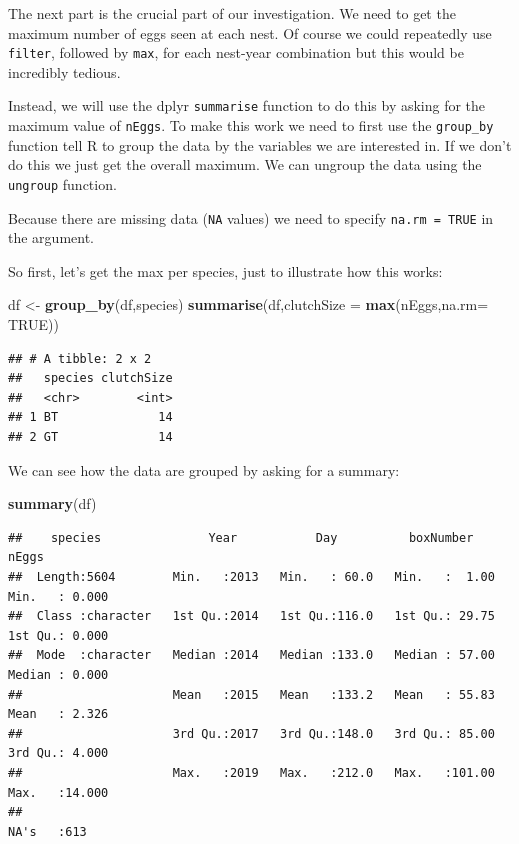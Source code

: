 \documentclass[
  a4paperpaper,
]{book}
\newenvironment{Shaded}{\begin{snugshade}}{\end{snugshade}}
\newcommand{\DataTypeTok}[1]{\textcolor[rgb]{0.13,0.29,0.53}{#1}}
\newcommand{\KeywordTok}[1]{\textcolor[rgb]{0.13,0.29,0.53}{\textbf{#1}}}
\newcommand{\NormalTok}[1]{#1}
\newcommand{\OtherTok}[1]{\textcolor[rgb]{0.56,0.35,0.01}{#1}}
\newcommand{\StringTok}[1]{\textcolor[rgb]{0.31,0.60,0.02}{#1}}
\begin{document}
The next part is the crucial part of our investigation. We need to get the maximum number of eggs seen at each nest. Of course we could repeatedly use \texttt{filter}, followed by \texttt{max}, for each nest-year combination but this would be incredibly tedious.

Instead, we will use the dplyr \texttt{summarise} function to do this by asking for the maximum value of \texttt{nEggs}. To make this work we need to first use the \texttt{group\_by} function tell R to group the data by the variables we are interested in. If we don't do this we just get the overall maximum. We can ungroup the data using the \texttt{ungroup} function.

Because there are missing data (\texttt{NA} values) we need to specify \texttt{na.rm\ =\ TRUE} in the argument.

So first, let's get the max per species, just to illustrate how this works:

\begin{Shaded}
\begin{Highlighting}[]
\NormalTok{df \textless{}{-}}\StringTok{ }\KeywordTok{group\_by}\NormalTok{(df,species)}
\KeywordTok{summarise}\NormalTok{(df,}\DataTypeTok{clutchSize =} \KeywordTok{max}\NormalTok{(nEggs,}\DataTypeTok{na.rm=} \OtherTok{TRUE}\NormalTok{))}
\end{Highlighting}
\end{Shaded}

\begin{verbatim}
## # A tibble: 2 x 2
##   species clutchSize
##   <chr>        <int>
## 1 BT              14
## 2 GT              14
\end{verbatim}

We can see how the data are grouped by asking for a summary:

\begin{Shaded}
\begin{Highlighting}[]
\KeywordTok{summary}\NormalTok{(df)}
\end{Highlighting}
\end{Shaded}

\begin{verbatim}
##    species               Year           Day          boxNumber          nEggs       
##  Length:5604        Min.   :2013   Min.   : 60.0   Min.   :  1.00   Min.   : 0.000  
##  Class :character   1st Qu.:2014   1st Qu.:116.0   1st Qu.: 29.75   1st Qu.: 0.000  
##  Mode  :character   Median :2014   Median :133.0   Median : 57.00   Median : 0.000  
##                     Mean   :2015   Mean   :133.2   Mean   : 55.83   Mean   : 2.326  
##                     3rd Qu.:2017   3rd Qu.:148.0   3rd Qu.: 85.00   3rd Qu.: 4.000  
##                     Max.   :2019   Max.   :212.0   Max.   :101.00   Max.   :14.000  
##                                                                     NA's   :613
\end{verbatim}
\end{document}
